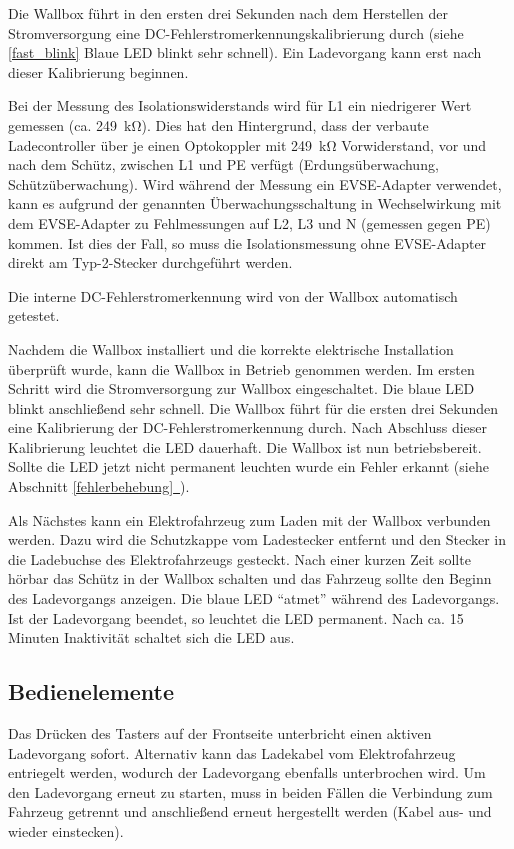 \documentclass[a4paper,10pt]{article}
\newcommand*{\fullref}[1]{Abschnitt \hyperref[{#1}]{\ref*{#1}~\nameref*{#1}}}
\begin{document}
\begin{multicols*}{2}
    Die Wallbox führt in den ersten drei Sekunden nach dem Herstellen der Stromversorgung
    eine DC-Fehlerstromerkennungskalibrierung durch (siehe \ref{fast_blink} Blaue LED blinkt sehr schnell).
    Ein Ladevorgang kann erst nach dieser Kalibrierung beginnen.

    Bei der Messung des Isolationswiderstands wird für L1 ein niedrigerer Wert
    gemessen (ca. \SI{249}{\kilo\ohm}). Dies hat den Hintergrund, dass
    der verbaute Ladecontroller über je einen Optokoppler mit
    \SI{249}{\kilo\ohm} Vorwiderstand, vor und nach dem Schütz, zwischen L1 und
    PE verfügt (Erdungsüberwachung, Schützüberwachung). Wird während der Messung ein EVSE-Adapter verwendet,
    kann es aufgrund der genannten Überwachungsschaltung in Wechselwirkung mit dem EVSE-Adapter zu Fehlmessungen
    auf L2, L3 und N (gemessen gegen PE) kommen. Ist dies der Fall, so muss die Isolationsmessung
    ohne EVSE-Adapter direkt am Typ-2-Stecker durchgeführt werden.

    Die interne DC-Fehlerstromerkennung wird von der Wallbox automatisch getestet.

    Nachdem die Wallbox installiert
    und die korrekte elektrische Installation überprüft wurde, kann die Wallbox in
    Betrieb genommen werden.
    Im ersten Schritt wird die Stromversorgung zur Wallbox eingeschaltet. Die
    blaue LED blinkt anschließend sehr schnell. Die Wallbox führt
    für die ersten drei Sekunden eine Kalibrierung der
    DC-Fehlerstromerkennung durch. Nach Abschluss dieser Kalibrierung
    leuchtet die LED dauerhaft. Die Wallbox ist nun betriebsbereit. Sollte die LED jetzt
    nicht permanent leuchten wurde ein Fehler erkannt (siehe \fullref{fehlerbehebung}).

    Als Nächstes kann ein Elektrofahrzeug zum Laden mit der Wallbox verbunden
    werden. Dazu wird die Schutzkappe vom Ladestecker entfernt und den Stecker in die
    Ladebuchse des Elektrofahrzeugs gesteckt. Nach einer kurzen Zeit sollte hörbar
    das Schütz in der Wallbox schalten und das Fahrzeug sollte den Beginn
    des Ladevorgangs anzeigen. Die blaue LED \enquote{atmet} während des
    Ladevorgangs. Ist der Ladevorgang beendet, so leuchtet die LED permanent. Nach ca.
    15 Minuten Inaktivität schaltet sich die LED aus.

    \subsection{Bedienelemente}\label{lockswitch}
    Das Drücken des Tasters auf der Frontseite unterbricht einen aktiven Ladevorgang
    sofort. Alternativ kann das Ladekabel vom Elektrofahrzeug entriegelt werden,
    wodurch der Ladevorgang ebenfalls unterbrochen wird. Um den Ladevorgang erneut
    zu starten, muss in beiden Fällen die Verbindung zum Fahrzeug getrennt und
    anschließend erneut hergestellt werden (Kabel aus- und wieder einstecken).


\end{multicols*}
\end{document}
